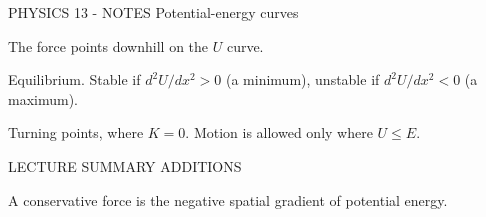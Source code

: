 PHYSICS 13 - NOTES
Potential-energy curves

The force points downhill on the \(U\) curve.

Equilibrium. Stable if \(d^2U/dx^2 \gt 0\) (a minimum), unstable if \(d^2U/dx^2 \lt 0\) (a maximum).

Turning points, where \(K = 0\). Motion is allowed only where \(U \le E\).

LECTURE SUMMARY ADDITIONS

A conservative force is the negative spatial gradient of potential energy.

